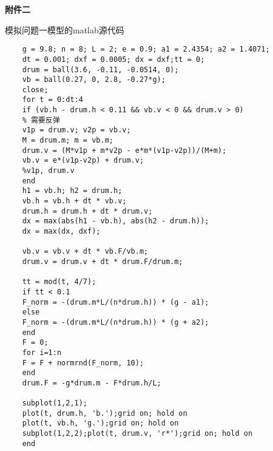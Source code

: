 \documentclass[withoutpreface,bwprint]{cumcmthesis} %
\begin{document}
\newpage
\textbf{{\Large 附件二}}

模拟问题一模型的matlab源代码

\begin{lstlisting}
	g = 9.8; n = 8; L = 2; e = 0.9; a1 = 2.4354; a2 = 1.4071;
	dt = 0.001; dxf = 0.0005; dx = dxf;tt = 0;
	drum = ball(3.6, -0.11, -0.0514, 0);
	vb = ball(0.27, 0, 2.8, -0.27*g);
	close;
	for t = 0:dt:4
	if (vb.h - drum.h < 0.11 && vb.v < 0 && drum.v > 0) 
	% 需要反弹
	v1p = drum.v; v2p = vb.v;
	M = drum.m; m = vb.m;
	drum.v = (M*v1p + m*v2p - e*m*(v1p-v2p))/(M+m);
	vb.v = e*(v1p-v2p) + drum.v;
	%v1p, drum.v
	end
	h1 = vb.h; h2 = drum.h;
	vb.h = vb.h + dt * vb.v;
	drum.h = drum.h + dt * drum.v;
	dx = max(abs(h1 - vb.h), abs(h2 - drum.h));
	dx = max(dx, dxf);
	
	vb.v = vb.v + dt * vb.F/vb.m;
	drum.v = drum.v + dt * drum.F/drum.m;
	
	tt = mod(t, 4/7);
	if tt < 0.1
	F_norm = -(drum.m*L/(n*drum.h)) * (g - a1);
	else
	F_norm = -(drum.m*L/(n*drum.h)) * (g + a2);
	end
	F = 0;
	for i=1:n
	F = F + normrnd(F_norm, 10);
	end
	drum.F = -g*drum.m - F*drum.h/L;
	
	subplot(1,2,1);
	plot(t, drum.h, 'b.');grid on; hold on
	plot(t, vb.h, 'g.');grid on; hold on
	subplot(1,2,2);plot(t, drum.v, 'r*');grid on; hold on
	end

\end{lstlisting}
\end{document}
